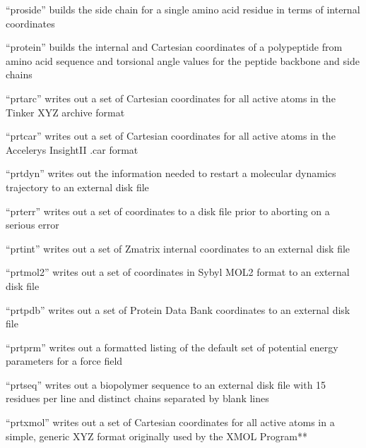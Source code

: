 \documentclass[letterpaper,11pt,english]{sphinxmanual}
\begin{document}

“proside” builds the side chain for a single amino acid residue in terms of internal coordinates


“protein” builds the internal and Cartesian coordinates of a polypeptide from amino acid sequence and torsional angle values for the peptide backbone and side chains


“prtarc” writes out a set of Cartesian coordinates for all active atoms in the Tinker XYZ archive format


“prtcar” writes out a set of Cartesian coordinates for all active atoms in the Accelerys InsightII .car format


“prtdyn” writes out the information needed to restart a molecular dynamics trajectory to an external disk file


“prterr” writes out a set of coordinates to a disk file prior to aborting on a serious error


“prtint” writes out a set of Z\sphinxhyphen{}matrix internal coordinates to an external disk file


“prtmol2” writes out a set of coordinates in Sybyl MOL2 format to an external disk file


“prtpdb” writes out a set of Protein Data Bank coordinates to an external disk file


“prtprm” writes out a formatted listing of the default set of potential energy parameters for a force field


“prtseq” writes out a biopolymer sequence to an external disk file with 15 residues per line and distinct chains separated by blank lines


“prtxmol” writes out a set of Cartesian coordinates for all active atoms in a simple, generic XYZ format originally used by the XMOL Program**
\end{document}
